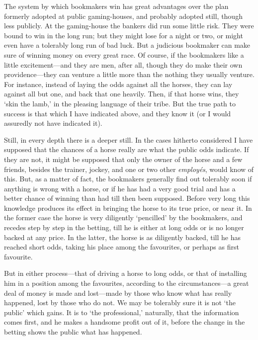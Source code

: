 \documentclass[letterpaper,12pt,oneside,openany]{memoir}
\begin{document}
The system by which bookmakers win has great
advantages over the plan formerly adopted at public
gaming-houses, and probably adopted still, though less
publicly. At the gaming-house the bankers did run
some little risk. They were bound to win in the long
run; but they might lose for a night or two, or might
even have a tolerably long run of bad luck. But a
judicious bookmaker can make sure of winning money
on every great race. Of course, if the bookmakers like
a little excitement---and they are men, after all, though
they do make their own providence---they can venture
a little more than the nothing they usually venture.
For instance, instead of laying the odds against all the
horses, they can lay against all but one, and back that
one heavily. Then, if that horse wins, they `skin the
lamb,' in the pleasing language of their tribe. But the
true path to success is that which I have indicated
above, and they know it (or I would assuredly not have
indicated it).

Still, in every depth there is a deeper still. In the
cases hitherto considered I have supposed that the
chances of a horse really are what the public odds
indicate. If they are not, it might be supposed that
only the owner of the horse and a few friends, besides
the trainer, jockey, and one or two other \textit{employ\'es},
would know of this. But, as a matter of fact, the
bookmakers generally find out tolerably soon if anything
is wrong with a horse, or if he has had a very
good trial and has a better chance of winning than had
till then been supposed. Before very long this knowledge
produces its effect in bringing the horse to its true
price, or near it. In the former case the horse is very
diligently `pencilled' by the bookmakers, and recedes
step by step in the betting, till he is either at long odds
or is no longer backed at any price. In the latter, the
horse is as diligently backed, till he has reached short
odds, taking his place among the favourites, or perhaps
as first favourite.

But in either process---that of driving a horse to long
odds, or that of installing him in a position among the
favourites, according to the circumstances---a great deal
of money is made and lost---made by those who know
what has really happened, lost by those who do not.
We may be tolerably sure it is not `the public' which
gains. It is to `the professional,' naturally, that the
information comes first, and he makes a handsome profit
out of it, before the change in the betting shows the
public what has happened.
\end{document}

